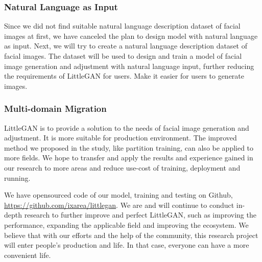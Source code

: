 \subsubsection*{Natural Language as Input}

Since we did not find suitable natural language description dataset of facial images at first,
    we have canceled the plan to design model with natural language as input.
Next, we will try to create a natural language description dataset of facial images.
The dataset will be used to design and train a model of facial image generation and adjustment with natural language input,
    further reducing the requirements of LittleGAN for users.
Make it easier for users to generate images.


\subsubsection*{Multi-domain Migration}

LittleGAN is to provide a solution to the needs of facial image generation and adjustment. It is more suitable for production environment.
The improved method we proposed in the study, like partition training, can also be applied to more fields.
We hope to transfer and apply the results and experience gained in our research to more areas and reduce use-cost of training, deployment and running.


\vspace{4ex}

We have opensourced code of our model, training and testing on Github, \url{https://github.com/ixarea/littlegan}.
We are and will continue to conduct in-depth research to further improve and perfect LittleGAN,
    such as improving the performance, expanding the applicable field and improving the ecosystem.
We believe that with our efforts and the help of the community,
    this research project will enter people's production and life.
    In that case, everyone can have a more convenient life.






